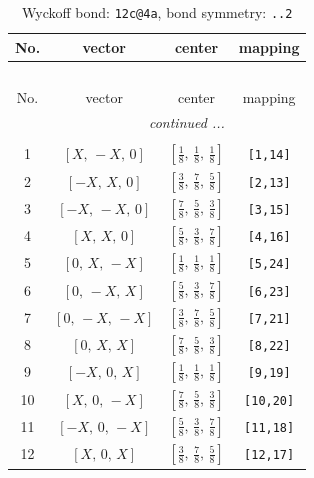 \documentclass[fleqn,8pt]{jsarticle}
\begin{document}
\renewcommand{\arraystretch}{1.2}
\begin{longtable}{cccc}
\caption{Wyckoff bond: {\tt 12c@4a}, bond symmetry: {\tt ..2}}
 \\
 \hline \hline
No. & vector & center & mapping \\ \hline \endfirsthead

\multicolumn{3}{l}{\tablename\ \thetable{}} \\
 \hline \hline
No. & vector & center & mapping \\ \hline \endhead

 \hline \hline
\multicolumn{3}{r}{\footnotesize\it continued ...} \\ \endfoot

 \hline \hline
\multicolumn{3}{r}{} \\ \endlastfoot

1 & $\left[ X,\, - X,\, 0 \right]$ & $\left[ \frac{1}{8},\, \frac{1}{8},\, \frac{1}{8} \right]$ & {\tt [1,14]} \\ \hline
2 & $\left[ - X,\, X,\, 0 \right]$ & $\left[ \frac{3}{8},\, \frac{7}{8},\, \frac{5}{8} \right]$ & {\tt [2,13]} \\ \hline
3 & $\left[ - X,\, - X,\, 0 \right]$ & $\left[ \frac{7}{8},\, \frac{5}{8},\, \frac{3}{8} \right]$ & {\tt [3,15]} \\ \hline
4 & $\left[ X,\, X,\, 0 \right]$ & $\left[ \frac{5}{8},\, \frac{3}{8},\, \frac{7}{8} \right]$ & {\tt [4,16]} \\ \hline
5 & $\left[ 0,\, X,\, - X \right]$ & $\left[ \frac{1}{8},\, \frac{1}{8},\, \frac{1}{8} \right]$ & {\tt [5,24]} \\ \hline
6 & $\left[ 0,\, - X,\, X \right]$ & $\left[ \frac{5}{8},\, \frac{3}{8},\, \frac{7}{8} \right]$ & {\tt [6,23]} \\ \hline
7 & $\left[ 0,\, - X,\, - X \right]$ & $\left[ \frac{3}{8},\, \frac{7}{8},\, \frac{5}{8} \right]$ & {\tt [7,21]} \\ \hline
8 & $\left[ 0,\, X,\, X \right]$ & $\left[ \frac{7}{8},\, \frac{5}{8},\, \frac{3}{8} \right]$ & {\tt [8,22]} \\ \hline
9 & $\left[ - X,\, 0,\, X \right]$ & $\left[ \frac{1}{8},\, \frac{1}{8},\, \frac{1}{8} \right]$ & {\tt [9,19]} \\ \hline
10 & $\left[ X,\, 0,\, - X \right]$ & $\left[ \frac{7}{8},\, \frac{5}{8},\, \frac{3}{8} \right]$ & {\tt [10,20]} \\ \hline
11 & $\left[ - X,\, 0,\, - X \right]$ & $\left[ \frac{5}{8},\, \frac{3}{8},\, \frac{7}{8} \right]$ & {\tt [11,18]} \\ \hline
12 & $\left[ X,\, 0,\, X \right]$ & $\left[ \frac{3}{8},\, \frac{7}{8},\, \frac{5}{8} \right]$ & {\tt [12,17]} \\
\end{longtable}
\end{document}
